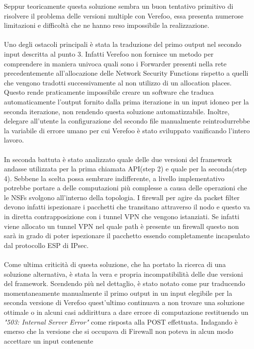 Seppur teoricamente questa soluzione sembra un buon tentativo primitivo di risolvere il problema delle versioni multiple con Verefoo, 
essa presenta numerose limitazioni e difficoltà che ne hanno reso impossibile la realizzazione.
\\ \\
Uno degli ostacoli principali è stata la traduzione del primo output nel secondo input descritta al punto 3. Infatti Verefoo non fornisce un metodo per comprendere in maniera univoca quali sono i Forwarder presenti nella rete precedentemente all'allocazione
delle Network Security Functions rispetto a quelli che vengono tradotti successivamente al non utilizzo di un allocation places. Questo rende praticamente impossibile creare un software che traduca automaticamente l'output fornito dalla 
prima iterazione in un input idoneo per la seconda iterazione, non rendendo questa soluzione automatizzabile. Inoltre, delegare all'utente la configurazione del secondo file manualmente reintrodurrebbe la variabile di errore umano per cui Verefoo è stato sviluppato
vanificando l'intero lavoro.
\\ \\
In seconda battuta è stato analizzato quale delle due versioni del framework andasse utilizzata per la prima chiamata API(step 2) e quale per la seconda(step 4). Sebbene la scelta possa sembrare indifferente, a livello implementativo potrebbe portare a delle computazioni più complesse a causa delle operazioni che le NSFs
svolgono all'interno della topologia. I firewall per agire da packet filter devono infatti ispezionare i pacchetti che transitano attraverso il nodo e questo va in diretta contrapposizione con i tunnel VPN che vengono istanziati. Se infatti viene allocato un tunnel VPN nel quale path è presente un firewall questo non sarà in
grado di poter ispezionare il pacchetto essendo completamente incapsulato dal protocollo ESP di IPsec.
\\ \\ 
Come ultima criticità di questa soluzione, che ha portato la ricerca di una soluzione alternativa, è stata la vera e propria incompatibilità delle due versioni del framework. Scendendo più nel dettaglio, è stato notato come pur traducendo momentaneamente manualmente il primo output in un input elegibile per la seconda versione di 
Verefoo quest'ultimo continuava a non trovare una soluzione ottimale o in alcuni casi addirittura a dare errore di computazione restituendo un \textit{"503: Internal Server Error"} come risposta alla POST effettuata. Indagando è emerso che la versione che si occupava di Firewall non poteva in alcun modo accettare un input contenente
